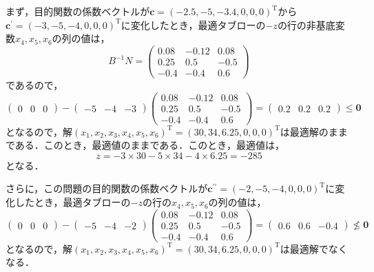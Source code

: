 \documentclass{jsreport}
\begin{document}
まず，目的関数の係数ベクトルが$\bm{c} = (-2.5, -5, -3.4, 0, 0, 0)^{\mathrm{T}}$から
$\bm{c}^{\prime} = (-3, -5, -4, 0, 0, 0)^{\mathrm{T}}$に変化したとき，最適タブローの$-z$の行の非基底変数$x_4, x_5, x_6$の列の値は，
\begin{equation}
  B^{-1}N = \left(
  \begin{array}{ccc}
    0.08 & -0.12 & 0.08 \\
    0.25 & 0.5 & -0.5 \\
    -0.4 & -0.4 & 0.6
  \end{array}
  \right) \nonumber
\end{equation}
であるので，
\begin{equation}
  \left(
  \begin{array}{ccc}
    0 & 0 & 0
  \end{array}
  \right) - \left(
  \begin{array}{ccc}
    -5 & -4 & -3
  \end{array}
  \right) \left(
  \begin{array}{ccc}
    0.08 & -0.12 & 0.08 \\
    0.25 & 0.5 & -0.5 \\
    -0.4 & -0.4 & 0.6
  \end{array}
  \right) = \left(
  \begin{array}{ccc}
    0.2 & 0.2 & 0.2
  \end{array}
  \right) \leq \bm{0} \nonumber
\end{equation}
となるので，解$(x_1, x_2, x_3, x_4, x_5, x_6)^{\mathrm{T}} = (30, 34, 6.25, 0, 0, 0)^{\mathrm{T}}$は最適解のままである．このとき，最適値のままである．このとき，最適値は，
\begin{equation}
  z = -3 \times 30 - 5 \times 34 - 4 \times 6.25 = -285 \nonumber
\end{equation}
となる．

さらに，この問題の目的関数の係数ベクトルが$\bm{c}^{\prime \prime} = (-2, -5, -4, 0, 0, 0)^{\mathrm{T}}$に変化したとき，最適タブローの$-z$の行の$x_4, x_5, x_6$の列の値は，
\begin{equation}
  \left(
  \begin{array}{ccc}
    0 & 0 & 0
  \end{array}
  \right) - \left(
  \begin{array}{ccc}
    -5 & -4 & -2
  \end{array}
  \right) \left(
  \begin{array}{ccc}
    0.08 & -0.12 & 0.08 \\
    0.25 & 0.5 & -0.5 \\
    -0.4 & -0.4 & 0.6
  \end{array}
  \right) = \left(
  \begin{array}{ccc}
    0.6 & 0.6 & -0.4
  \end{array}
  \right) \nleq \bm{0} \nonumber
\end{equation}
となるので，解$(x_1, x_2, x_3, x_4, x_5, x_6)^{\mathrm{T}} = (30, 34, 6.25, 0, 0, 0)^{\mathrm{T}}$は最適解でなくなる．
\end{document}
